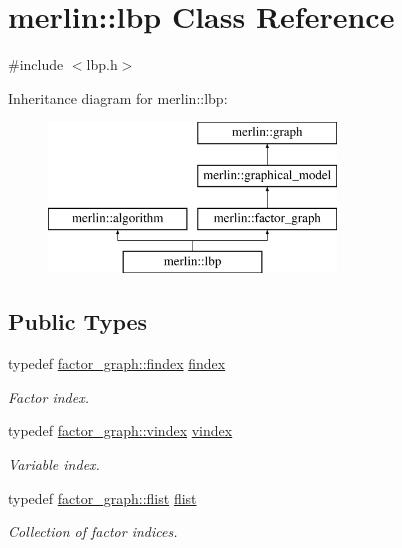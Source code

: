 \hypertarget{classmerlin_1_1lbp}{}\section{merlin\+:\+:lbp Class Reference}
\label{classmerlin_1_1lbp}


{\ttfamily \#include $<$lbp.\+h$>$}

Inheritance diagram for merlin\+:\+:lbp\+:\begin{figure}[H]
\begin{center}
\leavevmode
\includegraphics[height=4.000000cm]{classmerlin_1_1lbp}
\end{center}
\end{figure}
\subsection*{Public Types}
\begin{DoxyCompactItemize}
\item 
\hypertarget{classmerlin_1_1lbp_ad925905e6ca72cc3801260e7e63b7cae}{}typedef \hyperlink{classmerlin_1_1factor__graph_a533556bd4ec6961b63a91a80a8a37508}{factor\+\_\+graph\+::findex} \hyperlink{classmerlin_1_1lbp_ad925905e6ca72cc3801260e7e63b7cae}{findex}\label{classmerlin_1_1lbp_ad925905e6ca72cc3801260e7e63b7cae}

\begin{DoxyCompactList}\small\item\em Factor index. \end{DoxyCompactList}\item 
\hypertarget{classmerlin_1_1lbp_a2830aeb04ade80d6955b65297a59f68a}{}typedef \hyperlink{classmerlin_1_1factor__graph_a6b8a8220d86d6a6f91a8d2c7dd00ddc9}{factor\+\_\+graph\+::vindex} \hyperlink{classmerlin_1_1lbp_a2830aeb04ade80d6955b65297a59f68a}{vindex}\label{classmerlin_1_1lbp_a2830aeb04ade80d6955b65297a59f68a}

\begin{DoxyCompactList}\small\item\em Variable index. \end{DoxyCompactList}\item 
\hypertarget{classmerlin_1_1lbp_aefcbe2afa6efb09b12788e83cd7460f5}{}typedef \hyperlink{classmerlin_1_1factor__graph_a48dec4ea8a655315053984a81fe93ebc}{factor\+\_\+graph\+::flist} \hyperlink{classmerlin_1_1lbp_aefcbe2afa6efb09b12788e83cd7460f5}{flist}\label{classmerlin_1_1lbp_aefcbe2afa6efb09b12788e83cd7460f5}

\begin{DoxyCompactList}\small\item\em Collection of factor indices. \end{DoxyCompactList}\end{DoxyCompactItemize}
